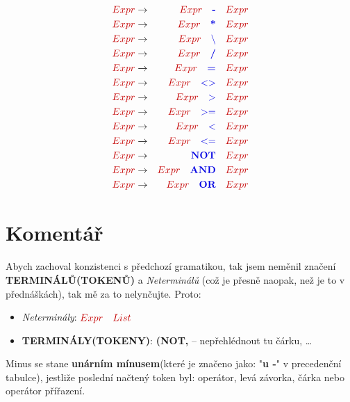 \documentclass[a4paper,11pt,fleqn,leqno]{article}
\begin{document}
\begin{eqnarray}
\textcolor{red1}{Expr}   &   \rightarrow     & \textcolor{red1}{Expr}\quad\textcolor{blue1}{\textbf{-}}\quad \textcolor{red1}{Expr}   \\
\textcolor{red1}{Expr}   &   \rightarrow     & \textcolor{red1}{Expr}\quad\textcolor{blue1}{\textbf{*}}\quad \textcolor{red1}{Expr}   \\
\textcolor{red1}{Expr}   &   \rightarrow     & \textcolor{red1}{Expr}\quad\textcolor{blue1}{\backslash}\quad \textcolor{red1}{Expr}   \\
\textcolor{red1}{Expr}   &   \rightarrow     & \textcolor{red1}{Expr}\quad\textcolor{blue1}{\textbf{/}}\quad \textcolor{red1}{Expr}   \\
\textcolor{red1}{Expr}   &   \rightarrow     & \textcolor{red1}{Expr}\quad\textcolor{blue1}{\textbf{=}}\quad \textcolor{red1}{Expr}   \\
\textcolor{red1}{Expr}   &   \rightarrow     & \textcolor{red1}{Expr}\quad\textcolor{blue1}{<>}\quad \textcolor{red1}{Expr}   \\
\textcolor{red1}{Expr}   &   \rightarrow     & \textcolor{red1}{Expr}\quad\textcolor{blue1}{>}\quad \textcolor{red1}{Expr}   \\
\textcolor{red1}{Expr}   &   \rightarrow     & \textcolor{red1}{Expr}\quad\textcolor{blue1}{>=}\quad \textcolor{red1}{Expr}   \\
\textcolor{red1}{Expr}   &   \rightarrow     & \textcolor{red1}{Expr}\quad\textcolor{blue1}{<}\quad \textcolor{red1}{Expr}   \\
\textcolor{red1}{Expr}   &   \rightarrow     & \textcolor{red1}{Expr}\quad\textcolor{blue1}{<=}\quad \textcolor{red1}{Expr}   \\
\textcolor{red1}{Expr}   &   \rightarrow     & \textcolor{blue1}{\textbf{NOT}}\quad \textcolor{red1}{Expr}   \\
\textcolor{red1}{Expr}   &   \rightarrow     & \textcolor{red1}{Expr}\quad \textcolor{blue1}{\textbf{AND}}\quad \textcolor{red1}{Expr}   \\
\textcolor{red1}{Expr}   &   \rightarrow     & \textcolor{red1}{Expr}\quad \textcolor{blue1}{\textbf{OR}}\quad  \textcolor{red1}{Expr}
\end{eqnarray}

\section{Komentář}

Abych zachoval konzistenci s předchozí gramatikou, tak jsem neměnil značení \textcolor{blue1}{\textbf{TERMINÁLŮ(TOKENŮ)}} a \textcolor{red1}{\emph{Neterminálů}} (což je přesně naopak, než je to v přednáškách), tak mě za to nelynčujte. Proto:
\begin{itemize}
\item{\emph{Neterminály}: $\textcolor{red1}{Expr\quad List}$}
\item{\textbf{TERMINÁLY(TOKENY)}: \textcolor{blue1}{\textbf{(}\quad \textbf{NOT}\quad \textbf{,}} -- nepřehlédnout tu čárku, \dots}
\end{itemize}

Minus se stane \textbf{unárním mínusem}(které je značeno jako: "\textbf{u -}" v precedenční tabulce), jestliže poslední načtený token byl: operátor, levá závorka, čárka nebo operátor přířazení.
\enddocument
\end{document}
